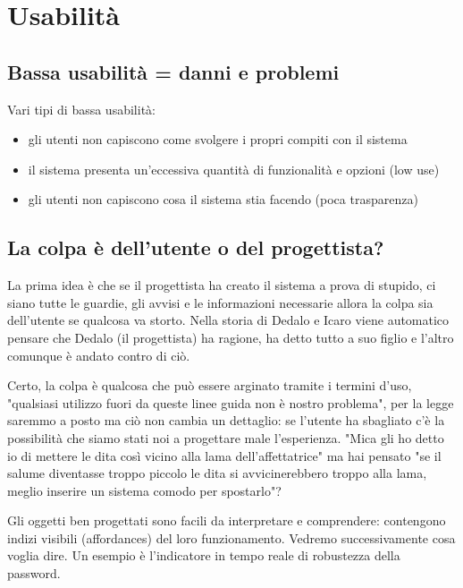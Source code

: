 \documentclass[11pt,a4paper]{book}
\begin{document}
\section{Usabilità}
\subsection{Bassa usabilità = danni e problemi}
Vari tipi di bassa usabilità:
\begin{itemize}
	\item gli utenti non capiscono come svolgere i propri compiti con il sistema
	\item il sistema presenta un'eccessiva quantità di funzionalità e opzioni (low use)
	\item gli utenti non capiscono cosa il sistema stia facendo (poca trasparenza)
\end{itemize}

\subsection{La colpa è dell'utente o del progettista?}
La prima idea è che se il progettista ha creato il sistema a prova di stupido, ci siano tutte le guardie, gli avvisi e le informazioni necessarie allora la colpa sia dell'utente se qualcosa va storto. Nella storia di Dedalo e Icaro viene automatico pensare che Dedalo (il progettista) ha ragione, ha detto tutto a suo figlio e l'altro comunque è andato contro di ciò.

Certo, la colpa è qualcosa che può essere arginato tramite i termini d'uso, "qualsiasi utilizzo fuori da queste linee guida non è nostro problema", per la legge saremmo a posto ma ciò non cambia un dettaglio: se l'utente ha sbagliato c'è la possibilità che siamo stati noi a progettare male l'esperienza. "Mica gli ho detto io di mettere le dita così vicino alla lama dell'affettatrice" ma hai pensato "se il salume diventasse troppo piccolo le dita si avvicinerebbero troppo alla lama, meglio inserire un sistema comodo per spostarlo"?

Gli oggetti ben progettati sono facili da interpretare e comprendere: contengono indizi visibili (affordances) del loro funzionamento. Vedremo successivamente cosa voglia dire. Un esempio è l'indicatore in tempo reale di robustezza della password.
\end{document}
